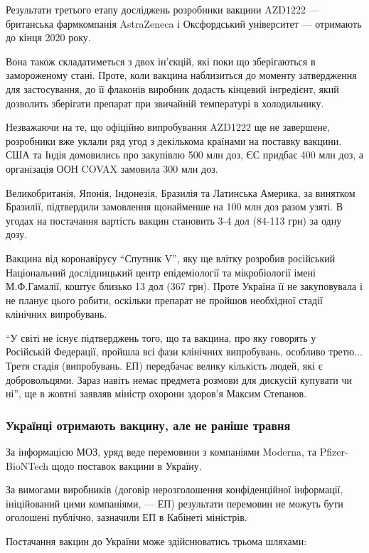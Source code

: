 Результати третього етапу досліджень розробники вакцини AZD1222 --- британська
фармкомпанія AstraZeneca і Оксфордський університет --- отримають до кінця 2020
року.

Вона також складатиметься з двох ін’єкцій, які поки що зберігаються в
замороженому стані. Проте, коли вакцина наблизиться до моменту затвердження для
застосування, до її флаконів виробник додасть кінцевий інгредієнт, який
дозволить зберігати препарат при звичайній температурі в холодильнику.

Незважаючи на те, що офіційно випробування AZD1222 ще не завершене, розробники
вже уклали ряд угод з декількома країнами на поставку вакцини. США та Індія
домовились про закупівлю 500 млн доз, ЄС придбає 400 млн доз, а організація ООН
COVAX замовила 300 млн доз.

Великобританія, Японія, Індонезія, Бразилія та Латинська Америка, за винятком
Бразилії, підтвердили замовлення щонайменше на 100 млн доз разом узяті. В
угодах на постачання вартість вакцин становить 3-4 дол (84-113 грн) за одну
дозу.

Вакцина від коронавірусу \enquote{Спутник V}, яку ще влітку розробив російський
Національний дослідницький центр епідеміології та мікробіології імені
М.Ф.Гамалії, коштує близько 13 дол (367 грн). Проте Україна її не закуповувала і
не планує цього робити, оскільки препарат не пройшов необхідної стадії
клінічних випробувань.

\enquote{У світі не існує підтверджень того, що та вакцина, про яку говорять у
Російській Федерації, пройшла всі фази клінічних випробувань, особливо третю...
Третя стадія (випробувань. \dshM ЕП) передбачає велику кількість людей, які є
добровольцями. Зараз навіть немає предмета розмови для дискусій \dshM купувати чи
ні}, \dshM ще в жовтні заявляв міністр охорони здоров'я Максим Степанов. 

\subsubsection{Українці отримають вакцину, але не раніше травня}

За інформацією МОЗ, уряд веде перемовини з компаніями Moderna, та
Pfizer-BioNTech щодо поставок вакцини в Україну.

За вимогами виробників (договір нерозголошення конфіденційної інформації,
ініційований цими компаніями, --- ЕП) результати перемовин не можуть бути
оголошені публічно, зазначили ЕП в Кабінеті міністрів.

Постачання вакцин до України може здійснюватись трьома шляхами:

